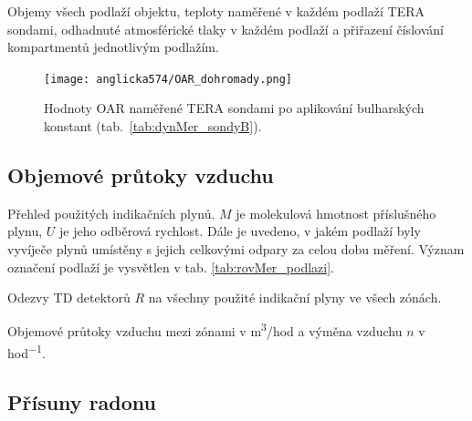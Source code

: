 \begin{table}[H]
    \centering
    \caption{Objemy všech podlaží objektu, teploty naměřené v každém podlaží TERA sondami, odhadnuté atmosférické tlaky v každém podlaží a přiřazení číslování kompartmentů jednotlivým podlažím.}
    \label{tab:anglicka574_objemy}
    
\end{table}
\begin{figure}[H]
    \centering
    \texttt{[image: anglicka574/OAR\_dohromady.png]}
    \caption{Hodnoty OAR naměřené TERA sondami po aplikování bulharských konstant (tab.~\ref{tab:dynMer_sondyB}).}
    \label{fig:anglicka574_OARdohromady}
\end{figure}

\subsection{Objemové průtoky vzduchu}

\begin{table}[H]
    \centering
    \caption{Přehled použitých indikačních plynů. $M$ je molekulová hmotnost příslušného plynu, $U$ je jeho odběrová rychlost. Dále je uvedeno, v jakém podlaží byly vyvíječe plynů umístěny s jejich celkovými odpary za celou dobu měření. Význam označení podlaží je vysvětlen v tab. \ref{tab:rovMer_podlazi}.}
    \label{tab:anglicka574_indikacniPlyny}
    
\end{table}
\begin{table}[H]
    \centering
    \caption{Odezvy TD detektorů $R$ na všechny použité indikační plyny ve všech zónách.}
    \label{tab:anglicka574_odezvyTD}
    
\end{table}

\begin{table}[H]
    \centering
    \caption{Objemové průtoky vzduchu mezi zónami v \si{m^3/hod} a výměna vzduchu $n$ v \si{hod^{-1}}.}
    \label{tab:anglicka574_prutoky}
    
\end{table}
\subsection{Přísuny radonu}

